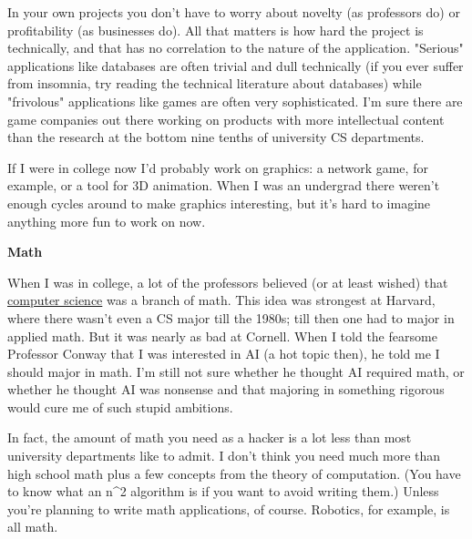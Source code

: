 In your
                    own projects you don't have to worry about novelty (as
                    professors do) or profitability (as businesses do). All that
                    matters is how hard the project is technically, and that has
                    no correlation to the nature of the application. "Serious"
                    applications like databases are often trivial and dull
                    technically (if you ever suffer from insomnia, try reading
                    the technical literature about databases) while "frivolous"
                    applications like games are often very sophisticated. I'm
                    sure there are game companies out there working on products
                    with more intellectual content than the research at the
                    bottom nine tenths of university CS departments.

If
                    I were in college now I'd probably work on graphics: a
                    network game, for example, or a tool for 3D animation. When
                    I was an undergrad there weren't enough cycles around to
                    make graphics interesting, but it's hard to imagine anything
                    more fun to work on now.

\textbf{Math}

When I was in college, a lot of the professors
                    believed (or at least wished) that
                    \href{http://www.paulgraham.com/hp.html}{computer science} was a branch of math.
                    This idea was strongest at Harvard, where there wasn't even
                    a CS major till the 1980s; till then one had to major in
                    applied math. But it was nearly as bad at Cornell. When I
                    told the fearsome Professor Conway that I was interested in
                    AI (a hot topic then), he told me I should major in math.
                    I'm still not sure whether he thought AI required math, or
                    whether he thought AI was nonsense and that majoring in
                    something rigorous would cure me of such stupid
                    ambitions.

In fact, the amount of math you need
                    as a hacker is a lot less than most university departments
                    like to admit. I don't think you need much more than high
                    school math plus a few concepts from the theory of
                    computation. (You have to know what an n\textasciicircum{}2 algorithm is if
                    you want to avoid writing them.) Unless you're planning to
                    write math applications, of course. Robotics, for example,
                    is all math.

